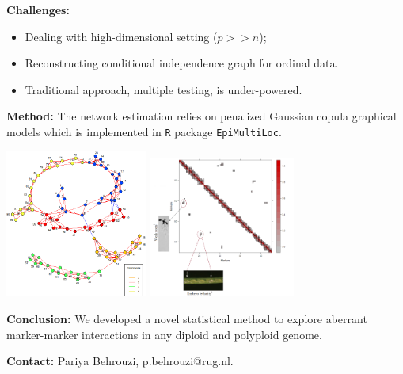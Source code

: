 \documentclass[a0paper,portrait]{baposter}
\begin{document}
\begin{poster}
{\vspace{0.15cm}
\textbf{Challenges:}
\vspace{-0.3cm}
\begin{itemize}
\item Dealing with high-dimensional setting ($p >> n$);
\vspace{-0.3cm}
\item Reconstructing conditional independence graph for ordinal data.
\vspace{-0.3cm}
\item Traditional approach, multiple testing, is under-powered.
\end{itemize}
\vspace{-0.1cm} 
\textbf{Method:} The network estimation relies on penalized Gaussian copula graphical models which is implemented in  \texttt{R} package \texttt{EpiMultiLoc}. 
\vspace{0.3cm}
\begin{center}
	\includegraphics[width=0.35\textwidth]{image1-Pariya.png} \hspace{0.5cm}
	\includegraphics[width=0.36\textwidth]{image2_Pariya.png}
	\vspace{0.3cm}
\end{center}
\vspace{-0.2cm}
\textbf{Conclusion:} We developed a novel statistical method to explore aberrant marker-marker interactions in any diploid and polyploid genome.

\vspace{0.1cm}
\textbf{Contact:} Pariya Behrouzi, p.behrouzi@rug.nl.
}


\end{poster}
\end{document}
